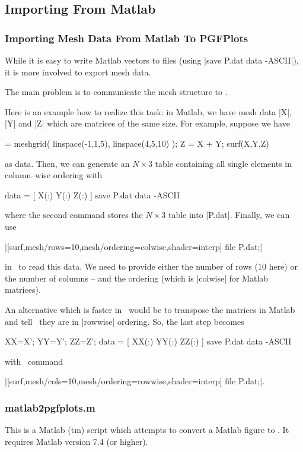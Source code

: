 {\begin{pgfgraphicnamed}
\subsection{Importing From Matlab}

\subsubsection{Importing Mesh Data From Matlab To PGFPlots}
While it is easy to write Matlab vectors to files (using |save P.dat data -ASCII|), it is more involved to export mesh data.

The main problem is to communicate the mesh structure to \PGFPlots.

Here is an example how to realize this task: in Matlab, we have mesh data |X|, |Y| and |Z| which are matrices of the same size. For example, suppose we have

\begin{codeexample} = meshgrid( linspace(-1,1,5), linspace(4,5,10) );
Z = X + Y;
surf(X,Y,Z)
\end{codeexample}
\noindent as data. Then, we can generate an $N \times 3$ table containing all single elements in column--wise ordering with

\begin{codeexample}
data = [ X(:) Y(:) Z(:) ]
save P.dat data -ASCII
\end{codeexample}
\noindent where the second command stores the $N \times 3$ table into |P.dat|. Finally, we can use 

|[surf,mesh/rows=10,mesh/ordering=colwise,shader=interp] file {P.dat};|

in \PGFPlots\ to read this data. We need to provide either the number of rows ($10$ here) or the number of columns -- and the ordering (which is |colwise| for Matlab matrices).

An alternative which is faster in \PGFPlots\ would be to transpose the matrices in Matlab and tell \PGFPlots\ they are in |rowwise| ordering. So, the last step becomes

\begin{codeexample}
XX=X'; YY=Y'; ZZ=Z';
data = [ XX(:) YY(:) ZZ(:) ]
save P.dat data -ASCII
\end{codeexample}
\noindent with \PGFPlots\ command

|[surf,mesh/cols=10,mesh/ordering=rowwise,shader=interp] file {P.dat};|.

\subsubsection{matlab2pgfplots.m}
This is a Matlab (tm) script which attempts to convert a Matlab figure to \PGFPlots. It requires Matlab version 7.4 (or higher).


\end{pgfgraphicnamed}}
